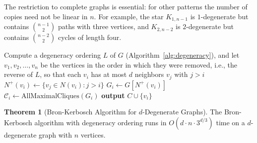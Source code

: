 \documentclass{article}
\theoremstyle{definition}
\newtheorem{theorem}{Theorem}
\begin{document}
The restriction to complete graphs is essential: for other patterns the number of copies need not be linear in $n$. For example, the star $K_{1,n-1}$ is $1$-degenerate but contains $\binom{n-1}{2}$ paths with three vertices, and $K_{2,n-2}$ is $2$-degenerate but contains $\binom{n-2}{2}$ cycles of length four.

\begin{algorithm}
\caption{Enumeration of Maximal Cliques in $d$-Degenerate Graphs}
\label{alg:enumerate-maximal-cliques}
\begin{algorithmic}[1]
        \State Compute a degeneracy ordering $L$ of $G$ (Algorithm~\ref{alg:degeneracy}), and let $v_1, v_2, \ldots, v_n$ be the vertices in the order in which they were removed, i.e., the reverse of $L$, so that each $v_i$ has at most $d$ neighbors $v_j$ with $j > i$
            \State $N^+(v_i) \gets \{v_j \in N(v_i) : j > i\}$ 
            \State $G_i \gets G[N^+(v_i)]$ 
            \State $\mathcal{C}_i \gets \text{AllMaximalCliques}(G_i)$ 
                    \State \textbf{output} $C \cup \{v_i\}$ 
                \EndIf
            \EndFor
        \EndFor
    \EndProcedure
\end{algorithmic}
\end{algorithm}

\begin{theorem}[Bron-Kerbosch Algorithm for $d$-Degenerate Graphs]
The Bron-Kerbosch algorithm with degeneracy ordering runs in $O(d \cdot n \cdot 3^{d/3})$ time on a $d$-degenerate graph with $n$ vertices.
\end{theorem}
\end{document}
